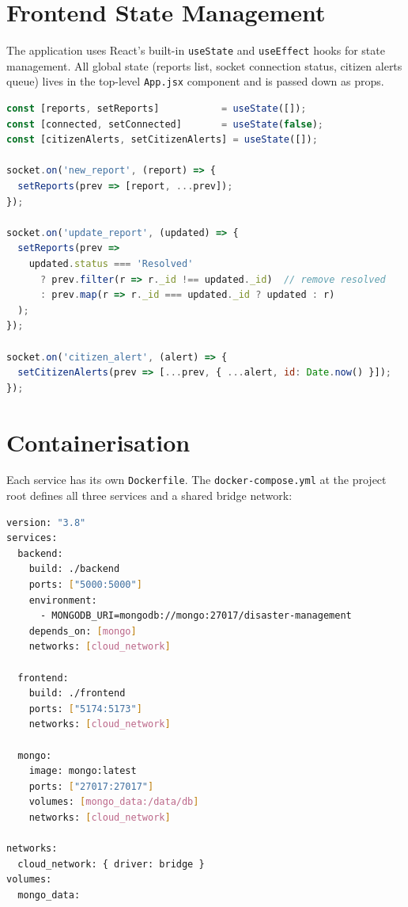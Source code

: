 \documentclass[12pt, a4paper]{report}
\begin{document}
\section{Frontend State Management}

The application uses React's built-in \texttt{useState} and \texttt{useEffect} hooks for state management. All global state (reports list, socket connection status, citizen alerts queue) lives in the top-level \texttt{App.jsx} component and is passed down as props.

\begin{lstlisting}[language=JavaScript,
  caption={App.jsx --- real-time state management with socket events}]
const [reports, setReports]           = useState([]);
const [connected, setConnected]       = useState(false);
const [citizenAlerts, setCitizenAlerts] = useState([]);

socket.on('new_report', (report) => {
  setReports(prev => [report, ...prev]);
});

socket.on('update_report', (updated) => {
  setReports(prev =>
    updated.status === 'Resolved'
      ? prev.filter(r => r._id !== updated._id)  // remove resolved
      : prev.map(r => r._id === updated._id ? updated : r)
  );
});

socket.on('citizen_alert', (alert) => {
  setCitizenAlerts(prev => [...prev, { ...alert, id: Date.now() }]);
});
\end{lstlisting}

\section{Containerisation}

Each service has its own \texttt{Dockerfile}. The \texttt{docker-compose.yml} at the project root defines all three services and a shared bridge network:

\begin{lstlisting}[language=bash,
  caption={docker-compose.yml --- multi-service orchestration}]
version: "3.8"
services:
  backend:
    build: ./backend
    ports: ["5000:5000"]
    environment:
      - MONGODB_URI=mongodb://mongo:27017/disaster-management
    depends_on: [mongo]
    networks: [cloud_network]

  frontend:
    build: ./frontend
    ports: ["5174:5173"]
    networks: [cloud_network]

  mongo:
    image: mongo:latest
    ports: ["27017:27017"]
    volumes: [mongo_data:/data/db]
    networks: [cloud_network]

networks:
  cloud_network: { driver: bridge }
volumes:
  mongo_data:
\end{lstlisting}
\end{document}
